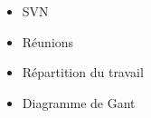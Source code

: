 \begin{itemize}
	\item{SVN}
	\item{Réunions}
	\item{Répartition du travail}
	\item{Diagramme de Gant}
\end{itemize}